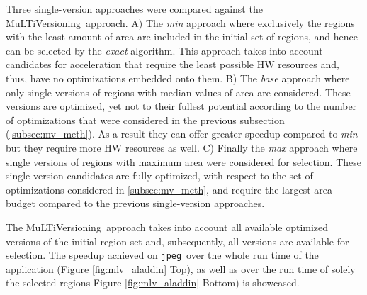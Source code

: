 \documentclass[]{usiinfthesis}
\newcommand{\multi}{MuLTiVersioning}
\newcommand{\jpeg}{\texttt{jpeg}}
\begin{document}
Three single-version approaches were compared against the \multi\ approach.
A) The \emph{min} approach where exclusively the regions with the least amount of area are included in the initial set of regions, and hence can be selected by the \emph{exact} algorithm. This approach 
takes into account candidates for acceleration that require the least possible HW resources and, thus, 
have no optimizations embedded onto them.
B) The \emph{base} approach
where only single versions of regions with median values of area are considered. These versions are
optimized, yet not to their fullest potential according to the number of optimizations that were
considered in the previous subsection (\ref{subsec:mv_meth}). As a result they can offer greater speedup compared to \emph{min}
but they require more HW resources as well.
C) Finally the \emph{max} approach where single versions of regions with maximum 
area were considered for selection. These single version candidates are fully optimized, with respect
to the set of optimizations considered in \ref{subsec:mv_meth}, and require the largest area budget 
compared to the previous single-version approaches.\par

The \multi\ approach takes into account all available optimized versions of the initial region set and, subsequently, all versions are available for selection.
The speedup achieved on \jpeg\ over the whole run time of the application (Figure \ref{fig:mlv_aladdin} Top), 
as well as over the run time of solely the selected regions Figure \ref{fig:mlv_aladdin} Bottom) is 
showcased.
\end{document}
